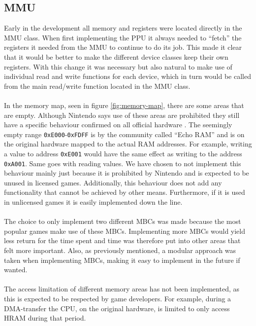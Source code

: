 \subsection{MMU}
Early in the development all memory and registers were located directly in the MMU class. 
When first implementing the PPU it always needed to ``fetch'' the registers it needed from the MMU to continue to do its job.
This made it clear that it would be better to make the different device classes keep their own registers.
With this change it was necessary but also natural to make use of individual read and write functions for each device, which in turn would be called from the main read/write function located in the MMU class.
\\\\
In the memory map, seen in figure \ref{fig:memory-map}, there are some areas that are empty.
Although Nintendo says use of these areas are prohibited they still have a specific behaviour confirmed on all official hardware \cite{pandocsechoram}.
The seemingly empty range \texttt{0xE000}-\texttt{0xFDFF} is by the community called ``Echo RAM'' and is on the original hardware mapped to the actual RAM addresses.
For example, writing a value to address \texttt{0xE001} would have the same effect as writing to the address \texttt{0xA001}. Same goes with reading values.
We have chosen to not implement this behaviour mainly just because it is prohibited by Nintendo and is expected to be unused in licensed games. 
Additionally, this behaviour does not add any functionality that cannot be achieved by other means.
Furthermore, if it is used in unlicensed games it is easily implemented down the line.  
\\\\
The choice to only implement two different MBCs was made because the most popular games make use of these MBCs. 
Implementing more MBCs would yield less return for the time spent and time was therefore put into other areas that felt more important. Also, as previously mentioned, a modular approach was taken when implementing MBCs, making it easy to implement in the future if wanted.
\\\\
The access limitation of different memory areas has not been implemented, as this is expected to be respected by game developers. For example, during a DMA-transfer the CPU, on the original hardware, is limited to only access HRAM during that period.

